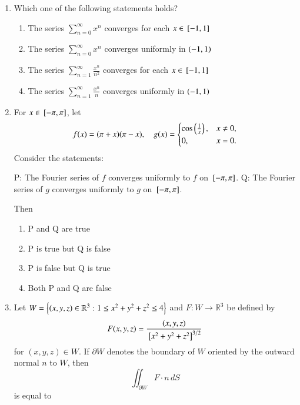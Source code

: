 \documentclass[journal,12pt,onecolumn]{IEEEtran}
\theoremstyle{remark}
\begin{document}
\begin{enumerate}
\item Which one of the following statements holds?
\\[-0.3em]\makebox[\textwidth][r]{\textit{[GATE EE 2025]}}

\begin{enumerate}[label=(\Alph*)]
\item The series $\sum_{n=0}^\infty x^n$ converges for each $x \in {}\left[-1,1\right]$
\item The series $\sum_{n=0}^\infty x^n$ converges uniformly in $\left(-1,1\right)$
\item The series $\sum_{n=1}^\infty \frac{x^n}{n^2}$ converges for each $x \in {}\left[-1,1\right]$
\item The series $\sum_{n=1}^\infty \frac{x^n}{n}$ converges uniformly in $\left(-1,1\right)$
\end{enumerate}


\item For $x \in {}\left[-\pi,\pi\right]$, let
\[
f(x) = (\pi + x)(\pi - x), \quad 
g(x) =
\begin{cases}
\cos\left(\frac{1}{x}\right), & x \neq 0, \\
0, & x = 0.
\end{cases}
\]
Consider the statements:

P: The Fourier series of $f$ converges uniformly to $f$ on ${}\left[-\pi,\pi\right]$.  
Q: The Fourier series of $g$ converges uniformly to $g$ on ${}\left[-\pi,\pi\right]$.

Then
\\[-0.3em]\makebox[\textwidth][r]{\textit{[GATE EE 2025]}}

\begin{enumerate}[label=(\Alph*)]
\item P and Q are true
\item P is true but Q is false
\item P is false but Q is true
\item Both P and Q are false
\end{enumerate}

\item Let $W = \left\{(x,y,z) \in \mathbb{R}^3 : 1 \le x^2 + y^2 + z^2 \le 4\right\}$  
and $F:W \to \mathbb{R}^3$ be defined by
\[
F(x,y,z) = \frac{(x,y,z)}{{}\left[x^2 + y^2 + z^2\right]^{3/2}}
\]
for $(x,y,z) \in W$. If $\partial W$ denotes the boundary of $W$ oriented by the outward normal $n$ to $W$, then
\[
\iint_{\partial W} F \cdot n \, dS
\]
is equal to
\\[-0.3em]\makebox[\textwidth][r]{\textit{[GATE EE 2025]}}


\end{enumerate}
\end{document}
